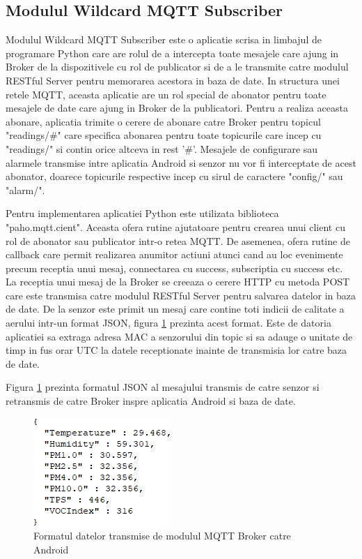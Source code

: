 \subsection{Modulul Wildcard MQTT Subscriber}\label{subsec:pi_mqttbroker_wildcard}
Modulul Wildcard MQTT Subscriber este o aplicatie scrisa in limbajul de programare Python care are rolul de a intercepta toate mesajele care ajung in Broker de la dispozitivele 
cu rol de publicator si de a le transmite catre modulul RESTful Server pentru memorarea acestora in baza de date. In structura unei retele MQTT, aceasta aplicatie are un rol 
special de abonator pentru toate mesajele de date care ajung in Broker de la publicatori. Pentru a realiza aceasta abonare, aplicatia trimite o cerere de abonare catre 
Broker pentru topicul "readings/\#" care specifica abonarea pentru toate topicurile care incep cu "readings/" si contin orice altceva in rest '\#'. Mesajele de configurare 
sau alarmele transmise intre aplicatia Android si senzor nu vor fi interceptate de acest abonator, doarece topicurile respective incep cu sirul de caractere "config/" sau 
"alarm/".

Pentru implementarea aplicatiei Python este utilizata biblioteca "paho.mqtt.cient". Aceasta ofera rutine ajutatoare pentru crearea unui client cu rol de abonator sau publicator 
intr-o retea MQTT. De asemenea, ofera rutine de callback care permit realizarea anumitor actiuni atunci cand au loc evenimente precum receptia unui mesaj, connectarea cu 
success, subscriptia cu success etc. La receptia unui mesaj de la Broker se creeaza o cerere HTTP cu metoda POST care este transmisa catre modulul RESTful Server pentru 
salvarea datelor in baza de date. De la senzor este primit un mesaj care contine toti indicii de calitate a aerului intr-un format JSON, figura 
\ref{fig:Mqtt2AndroidDataFormat} prezinta acest format. Este de datoria aplicatiei sa extraga adresa MAC a senzorului din topic si sa adauge o unitate de timp in 
fus orar UTC la datele receptionate inainte de transmisia lor catre baza de date.

Figura \ref{fig:Mqtt2AndroidDataFormat} prezinta formatul JSON al mesajului transmis de catre senzor si retransmis de catre Broker inspre aplicatia Android si baza de date.  
\begin{figure}[H]
    \centering
    \includegraphics[scale=0.8]{figs/Mqtt2AndroidDataFormat.png}
    \caption{Formatul datelor transmise de modulul MQTT Broker catre Android}
    \label{fig:Mqtt2AndroidDataFormat}
\end{figure}

